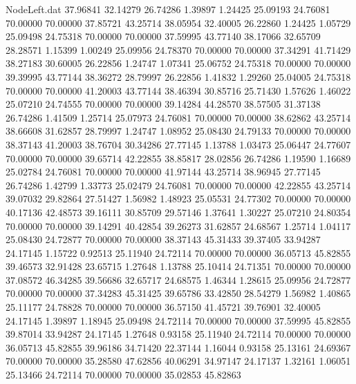 \begin{filecontents}{NodeLeft.dat}
  37.96841   32.14279   26.74286     1.39897    1.24425   25.09193   24.76081   70.00000   70.00000   37.85721   43.25714
  38.05954   32.40005   26.22860     1.24425    1.05729   25.09498   24.75318   70.00000   70.00000   37.59995   43.77140
  38.17066   32.65709   28.28571     1.15399    1.00249   25.09956   24.78370   70.00000   70.00000   37.34291   41.71429
  38.27183   30.60005   26.22856     1.24747    1.07341   25.06752   24.75318   70.00000   70.00000   39.39995   43.77144
  38.36272   28.79997   26.22856     1.41832    1.29260   25.04005   24.75318   70.00000   70.00000   41.20003   43.77144
  38.46394   30.85716   25.71430     1.57626    1.46022   25.07210   24.74555   70.00000   70.00000   39.14284   44.28570
  38.57505   31.37138   26.74286     1.41509    1.25714   25.07973   24.76081   70.00000   70.00000   38.62862   43.25714
  38.66608   31.62857   28.79997     1.24747    1.08952   25.08430   24.79133   70.00000   70.00000   38.37143   41.20003
  38.76704   30.34286   27.77145     1.13788    1.03473   25.06447   24.77607   70.00000   70.00000   39.65714   42.22855
  38.85817   28.02856   26.74286     1.19590    1.16689   25.02784   24.76081   70.00000   70.00000   41.97144   43.25714
  38.96945   27.77145   26.74286     1.42799    1.33773   25.02479   24.76081   70.00000   70.00000   42.22855   43.25714
  39.07032   29.82864   27.51427     1.56982    1.48923   25.05531   24.77302   70.00000   70.00000   40.17136   42.48573
  39.16111   30.85709   29.57146     1.37641    1.30227   25.07210   24.80354   70.00000   70.00000   39.14291   40.42854
  39.26273   31.62857   24.68567     1.25714    1.04117   25.08430   24.72877   70.00000   70.00000   38.37143   45.31433
  39.37405   33.94287   24.17145     1.15722    0.92513   25.11940   24.72114   70.00000   70.00000   36.05713   45.82855
  39.46573   32.91428   23.65715     1.27648    1.13788   25.10414   24.71351   70.00000   70.00000   37.08572   46.34285
  39.56686   32.65717   24.68575     1.46344    1.28615   25.09956   24.72877   70.00000   70.00000   37.34283   45.31425
  39.65786   33.42850   28.54279     1.56982    1.40865   25.11177   24.78828   70.00000   70.00000   36.57150   41.45721
  39.76901   32.40005   24.17145     1.39897    1.18945   25.09498   24.72114   70.00000   70.00000   37.59995   45.82855
  39.87014   33.94287   24.17145     1.27648    0.93158   25.11940   24.72114   70.00000   70.00000   36.05713   45.82855
  39.96186   34.71420   22.37144     1.16044    0.93158   25.13161   24.69367   70.00000   70.00000   35.28580   47.62856
  40.06291   34.97147   24.17137     1.32161    1.06051   25.13466   24.72114   70.00000   70.00000   35.02853   45.82863

\end{filecontents}
